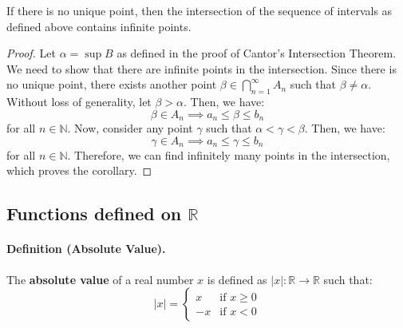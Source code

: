 \documentclass[openany]{book}
\numberwithin{equation}{section}
\begin{document}
\begin{corollary}
    If there is no unique point, then the intersection of the sequence of intervals as defined above contains infinite points. 
\end{corollary}
\begin{proof}
    Let $\alpha = \sup B$ as defined in the proof of Cantor's Intersection Theorem. We need to show that there are infinite points in the intersection. Since there is no unique point, there exists another point $\beta \in \bigcap_{n=1}^{\infty} A_n$ such that $\beta \neq \alpha$. Without loss of generality, let $\beta > \alpha$. Then, we have:
$$\beta \in A_n \implies a_n \leq \beta \leq b_n$$
for all $n \in \mathbb{N}$. Now, consider any point $\gamma$ such that $\alpha < \gamma < \beta$. Then, we have:
$$\gamma \in A_n \implies a_n \leq \gamma \leq b_n$$
for all $n \in \mathbb{N}$. Therefore, we can find infinitely many points in the intersection, which proves the corollary.
\end{proof}

\subsection{Functions defined on $\mathbb{R}$}
\paragraph{Definition (Absolute Value).}

    The \textbf{absolute value} of a real number $x$ is defined as $|x|: \mathbb{R} \rightarrow \mathbb{R}$ such that:
    $$|x| = 
    \begin{cases}
        x & \text{if } x \geq 0 \\
        -x & \text{if } x < 0
    \end{cases}$$
\par
\end{document}
